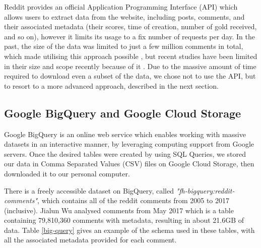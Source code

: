\documentclass[bsc,frontabs,twoside,singlespacing,parskip,deptreport]{infthesis}
\begin{document}
Reddit provides an official Application Programming Interface (API) which allows users to extract data from the website, including posts, comments, and their associated metadata (their scores, time of creation, number of gold received, and so on), however it limits its usage to a fix number of requests per day. In the past, the size of the data was limited to just a few million comments in total, which made utilising this approach possible \cite{singer}, but recent studies have been limited in their size and scope recently because of it \cite{weninger} \cite{autmanHasan2016Acso}. Due to the massive amount of time required to download even a subset of the data, we chose not to use the API, but to resort to a more advanced approach, described in the next section.

\subsection{Google BigQuery and Google Cloud Storage}\label{bigquery}

Google BigQuery is an online web service which enables working with massive datasets in an interactive manner, by leveraging computing support from Google servers. Once the desired tables were created by using SQL Queries, we stored our data in Comma Separated Values (CSV) files on Google Cloud Storage, then downloaded it to our personal computer.

There is a freely accessible dataset on BigQuery, called \textit{"fh-bigquery:reddit-comments"}, which contains all of the reddit comments from 2005 to 2017 (inclusive). Jialun Wu \cite{masters} analysed comments from May 2017 which is a table containing 79,810,360 comments with metadata, resulting in about 21.6GB of data. Table \ref{big-query} gives an example of the schema used in these tables, with all the associated metadata provided for each comment.
\end{document}
